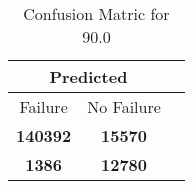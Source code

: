 \begin{table}[] 
\caption{Confusion Matric for 90.0} 
\label{Table: Prediction Accuracy-None90.0SVMEKF-ignoreReflection-Reflection} 
\centering 
\begin{tabular} 
 {@{}ccc@{}} 
\toprule 
\multicolumn{2}{c}{\textbf{Predicted}}
 \\ \midrule 
\multicolumn{1}{|c|}{Failure} & 
\multicolumn{1}{c|}{No Failure}
 \\ \midrule 
\multicolumn{1}{|c|}{\color{green}\textbf{140392}} & 
\multicolumn{1}{c|}{\color{green}\textbf{15570}}
 \\ \midrule 
\multicolumn{1}{|c|}{\color{red}\textbf{1386}} & 
\multicolumn{1}{c|}{\color{red}\textbf{12780}}
 \\ \bottomrule 
\end{tabular} 
\end{table} 
